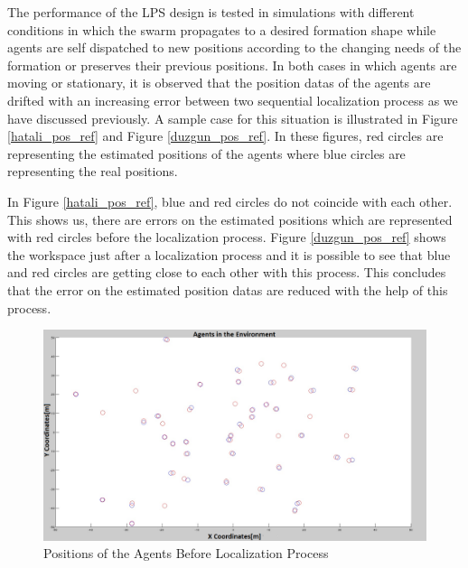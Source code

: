The performance of the LPS design is tested in simulations with different conditions in which the swarm propagates to a desired formation shape while agents are self dispatched to new positions according to the changing needs of the formation or preserves their previous positions. In both cases in which agents are moving or stationary, it is observed that the position datas of the agents are drifted with an increasing error between two  sequential localization process as we have discussed previously. A sample case for this situation is illustrated in Figure \ref{hatali_pos_ref} and Figure \ref{duzgun_pos_ref}. In these figures, red circles are representing the estimated positions of the agents where blue circles are representing the real positions. 

In Figure \ref{hatali_pos_ref}, blue and red circles do not coincide with each other. This shows us, there are errors on the estimated positions which are represented with red circles before the localization process. Figure \ref{duzgun_pos_ref} shows the workspace just after a localization process and it is possible to see that blue and red circles are getting close to each other with this process. This concludes that the error on the estimated position datas are reduced with the help of this process.		

\begin{figure}[H]
\centering
\captionsetup{format=hang,justification=centerfirst}
\caption{Positions of the Agents Before Localization Process} \label{hatali_pos_ref}
\centerline{
\includegraphics[scale = 0.35]{Pozisyon_1_Hatali}}
\label{fig:lps}
\end{figure}

